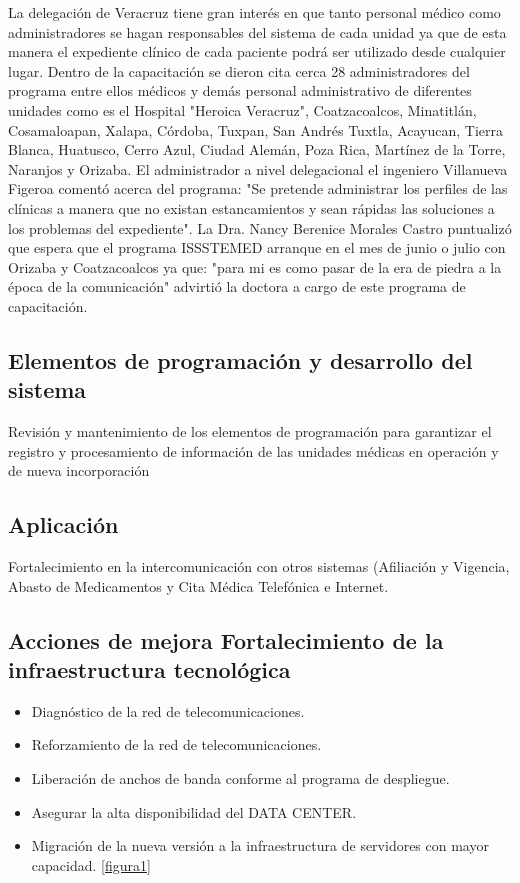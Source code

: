 La delegación de Veracruz tiene gran interés en que tanto personal médico como administradores se hagan responsables del sistema de cada unidad ya que de esta manera el expediente clínico de cada paciente podrá ser utilizado desde cualquier lugar.
Dentro de la capacitación se dieron cita cerca 28 administradores del programa entre ellos médicos y demás personal administrativo de diferentes unidades como es el Hospital "Heroica Veracruz", Coatzacoalcos, Minatitlán, Cosamaloapan, Xalapa, Córdoba, Tuxpan, San Andrés Tuxtla, Acayucan, Tierra Blanca, Huatusco, Cerro Azul, Ciudad Alemán, Poza Rica, Martínez de la Torre, Naranjos y Orizaba.
El administrador a nivel delegacional el ingeniero Villanueva Figeroa comentó acerca del programa: "Se pretende administrar los perfiles de las clínicas a manera que no existan estancamientos y sean rápidas las soluciones a los problemas del expediente".
La Dra. Nancy Berenice Morales Castro puntualizó que espera que el programa ISSSTEMED arranque en el mes de junio o julio con Orizaba y Coatzacoalcos ya que: "para mi es como pasar de la era de piedra a la época de la comunicación" advirtió la doctora a cargo de este programa de capacitación.\cite{ISSTE2}

\subsection{Elementos de programación y desarrollo del sistema}
 Revisión y mantenimiento de los elementos de programación para garantizar el registro y procesamiento de información de las unidades médicas en operación y de nueva incorporación \cite{ISSTE}

\subsection{Aplicación}
 Fortalecimiento en la intercomunicación con otros sistemas (Afiliación y Vigencia, Abasto de Medicamentos y Cita Médica Telefónica e Internet.

\subsection{Acciones de mejora Fortalecimiento de la infraestructura tecnológica }
\begin{itemize}
  \item Diagnóstico de la red de telecomunicaciones.
  \item Reforzamiento de la red de telecomunicaciones.
  \item Liberación de anchos de banda conforme al programa de despliegue.
  \item Asegurar la alta disponibilidad del DATA CENTER.
  \item Migración de la nueva versión a la infraestructura de servidores con mayor capacidad. \ref{figura1}


\end{itemize}

